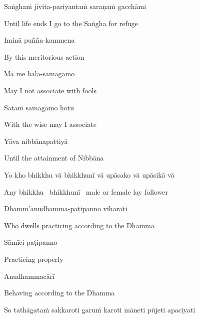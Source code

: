 Saṅghaṁ jīvita-pariyantaṁ saraṇaṁ gacchāmi

\begin{english}
  Until life ends I go to the Saṅgha for refuge
\end{english}

Iminā puñña-kammena

\begin{english}
  By this meritorious action
\end{english}

Mā me bāla-samāgamo

\begin{english}
  May I not associate with fools
\end{english}

Sataṁ samāgamo hotu

\begin{english}
  With the wise may I associate
\end{english}

Yāva nibbānapattiyā

\begin{english}
  Until the attainment of Nibbāna
\end{english}


Yo kho bhikkhu vā bhikkhunī vā upāsako vā upāsikā vā

\begin{english}
  Any bhikkhu \breathmark\ bhikkhunī \breathmark\ male or female lay follower
\end{english}


Dhamm'ānudhamma-paṭipanno viharati

\begin{english}
  Who dwells practicing according to the Dhamma
\end{english}

\ifbfiveversion\clearpage\fi

Sāmīci-paṭipanno

\begin{english}
  Practicing properly
\end{english}

Anudhammacārī

\begin{english}
  Behaving according to the Dhamma
\end{english}

\begin{pali-hang}
So tathāgataṁ sakkaroti garuṁ karoti māneti pūjeti apaciyati
\end{pali-hang}

